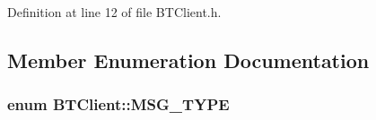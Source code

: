 Definition at line 12 of file B\-T\-Client.\-h.



\subsection{Member Enumeration Documentation}
\hypertarget{classBTClient_aa4e607f3ba1fea67548e2c2864915cb8}{
\subsubsection[{M\-S\-G\-\_\-\-T\-Y\-P\-E}]{\setlength{\rightskip}{0pt plus 5cm}enum {\bf B\-T\-Client\-::\-M\-S\-G\-\_\-\-T\-Y\-P\-E}\hspace{0.3cm}{\ttfamily [private]}}}\label{classBTClient_aa4e607f3ba1fea67548e2c2864915cb8}
